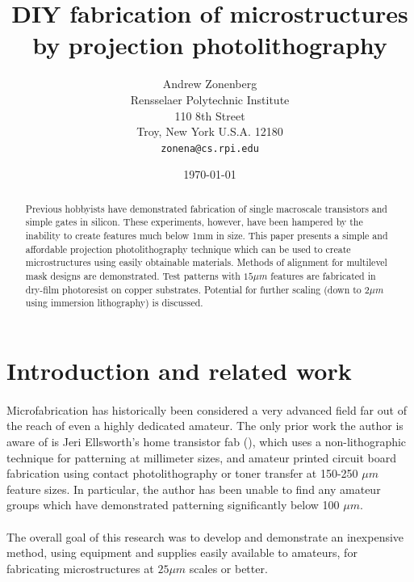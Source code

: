 \documentclass[twocolumn]{article}
\begin{document}
\title{DIY fabrication of microstructures by projection photolithography}
\author{Andrew Zonenberg\\
	Rensselaer Polytechnic Institute\\
	110 8th Street\\
	Troy, New York U.S.A. 12180\\
	\texttt{zonena@cs.rpi.edu}}
\date{\today}
\maketitle

\begin{abstract}
\paragraph*{}
Previous hobbyists have demonstrated fabrication of single macroscale transistors and simple gates in silicon. These
experiments, however, have been hampered by the inability to create features much below 1mm in size. This paper
presents a simple and affordable projection photolithography technique which can be used to create microstructures using
easily obtainable materials. Methods of alignment for multilevel mask designs are demonstrated. Test patterns with $15
\mu m$ features are fabricated in dry-film photoresist on copper substrates. Potential for further scaling (down to
$2 \mu m$ using immersion lithography) is discussed.
\end{abstract}

\section{Introduction and related work}
\paragraph*{}
Microfabrication has historically been considered a very advanced field far out of the reach of even a highly dedicated
amateur. The only prior work the author is aware of is Jeri Ellsworth's home transistor fab (\cite{ellsworth}), which
uses a non-lithographic technique for patterning at millimeter sizes, and amateur printed circuit board fabrication
using contact photolithography or toner transfer at 150-250 $\mu m$ feature sizes. In particular, the author has been
unable to find any amateur groups which have demonstrated patterning significantly below 100 $\mu m$.

\paragraph*{}
The overall goal of this research was to develop and demonstrate an inexpensive method, using equipment and supplies
easily available to amateurs, for fabricating microstructures at $25 \mu m$ scales or better.
\end{document}
